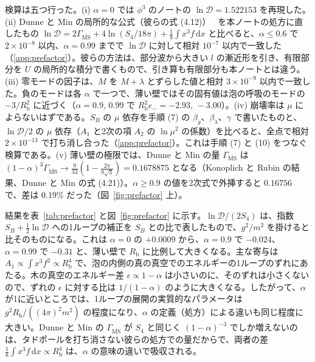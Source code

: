 \documentclass[a4paper,10pt]{ltjsarticle}
\newcommand{\dd}{\mathrm{d}}
\begin{document}
検算は五つ行った。(i) $\alpha=0$ では $\phi^3$ のノートの $\ln\mathcal D=1.522153$ を再現した。(ii) Dunne と Min の局所的な公式（彼らの式 (4.12)）~\cite{dunnemin} を本ノートの処方に直したもの $\ln\mathcal D=2\Gamma_{\overline{\mathrm{MS}}}+4\ln(S_4/18\pi)+\frac18\int x^3f\,\dd x$ と比べると、$\alpha\le0.6$ で $2\times10^{-8}$ 以内、$\alpha=0.99$ までで $\ln\mathcal D$ に対して相対 $10^{-7}$ 以内で一致した（\ref{app:prefactor}）。彼らの方法は、部分波から大きい $l$ の漸近形を引き、有限部分を $U$ の局所的な積分で書くもので、引き算も有限部分も本ノートとは違う。(iii) 零モードの因子は、$M$ を $M+\lambda$ とずらした値と相対 $3\times10^{-9}$ 以内で一致した。負のモードは各 $\alpha$ で一つで、薄い壁ではその固有値は泡の呼吸のモードの $-3/R_{\mathrm b}^2$ に近づく（$\alpha=0.9,\,0.99$ で $R_{\mathrm b}^2e_-=-2.93,\,-3.00$）。(iv) 崩壊率は $\mu$ によらないはずである。$S_B$ の $\mu$ 依存を手順 (7) の $\beta_g$、$\beta_\lambda$、$\gamma$ で書いたものと、$\ln\mathcal D/2$ の $\mu$ 依存（$A_1$ と2次の項 $A_2$ の $\ln\mu^2$ の係数）を比べると、全点で相対 $2\times10^{-13}$ で打ち消し合った（\ref{app:prefactor}）。これは手順 (7) と (10) をつなぐ検算である。(v) 薄い壁の極限では、Dunne と Min の量 $\Gamma_{\overline{\mathrm{MS}}}$ は $(1-\alpha)^3\Gamma_{\overline{\mathrm{MS}}}\to\frac{9}{32}(1-\frac{2\pi}{9\sqrt3})=0.1678875$ となる（Konoplich と Rubin の結果、Dunne と Min の式 (4.21)）。$\alpha\ge0.9$ の値を2次式で外挿すると $0.16756$ で、差は $0.19\%$ だった（図~\ref{fig:prefactor} 上）。

結果を表~\ref{tab:prefactor} と図~\ref{fig:prefactor} に示す。$\ln\mathcal D/(2S_4)$ は、指数 $S_B+\frac12\ln\mathcal D$ への1ループの補正を $S_B$ との比で表したもので、$g^2/m^2$ を掛けると比そのものになる。これは $\alpha=0$ の $+0.0009$ から、$\alpha=0.9$ で $-0.024$、$\alpha=0.99$ で $-0.31$ と、薄い壁で $R_{\mathrm b}$ に比例して大きくなる。主な寄与は $A_1\propto\int x^3f^2\propto R_{\mathrm b}^4$ で、泡の内側の真の真空でのエネルギーの1ループのずれにあたる。木の真空のエネルギー差 $\epsilon\propto1-\alpha$ は小さいのに、そのずれは小さくないので、ずれの $\epsilon$ に対する比は $1/(1-\alpha)$ のように大きくなる。したがって、$\alpha$ が1に近いところでは、1ループの展開の実質的なパラメータは $g^2R_{\mathrm b}/((4\pi)^2m^2)$ の程度になり、$\alpha$ の定義（処方）による違いも同じ程度に大きい。Dunne と Min の $\Gamma_{\overline{\mathrm{MS}}}$ が $S_4$ と同じく $(1-\alpha)^{-3}$ でしか増えないのは、タドポールを打ち消さない彼らの処方での量だからで、両者の差 $\frac18\int x^3f\,\dd x\propto R_{\mathrm b}^4$ は、$\alpha$ の意味の違いで吸収される。
\end{document}
